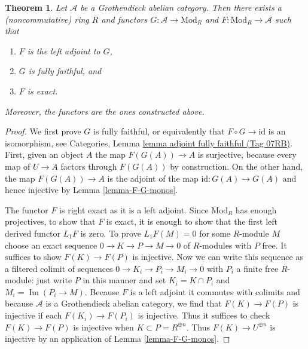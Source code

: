 \documentclass{amsart}
\theoremstyle{plain}
\newtheorem{theorem}[subsection]{Theorem}
\theoremstyle{definition}
\theoremstyle{remark}
\numberwithin{equation}{subsection}
\def\Im{\mathop{\mathrm{Im}}}
\begin{document}
\begin{theorem}
\label{theorem-gabriel-popescu}
Let $\mathcal{A}$ be a Grothendieck abelian category. Then there exists
a (noncommutative) ring $R$ and functors $G : \mathcal{A} \to \text{Mod}_R$
and $F : \text{Mod}_R \to \mathcal{A}$ such that
\begin{enumerate}
\item $F$ is the left adjoint to $G$,
\item $G$ is fully faithful, and
\item $F$ is exact.
\end{enumerate}
Moreover, the functors are the ones constructed above.
\end{theorem}

\begin{proof}
We first prove $G$ is fully faithful, or equivalently that
$F \circ G \to \text{id}$ is an isomorphism, see
Categories, Lemma \href{https://stacks.math.columbia.edu/tag/07RB}{lemma adjoint fully faithful (Tag 07RB)}.
First, given an object $A$ the map $F(G(A)) \to A$ is surjective,
because every map of $U \to A$ factors through $F(G(A))$ by construction.
On the other hand, the map $F(G(A)) \to A$ is the adjoint of the
map $\text{id} : G(A) \to G(A)$ and hence injective by
Lemma \ref{lemma-F-G-monos}.

\medskip\noindent
The functor $F$ is right exact as it is a left adjoint.
Since $\text{Mod}_R$ has enough projectives, to show that
$F$ is exact, it is enough to show that the first left derived
functor $L_1F$ is zero. To prove $L_1F(M) = 0$ for some $R$-module $M$
choose an exact sequence $0 \to K \to P \to M \to 0$
of $R$-modules with $P$ free. It suffices to show $F(K) \to F(P)$
is injective. Now we can write this sequence as a filtered
colimit of sequences $0 \to K_i \to P_i \to M_i \to 0$
with $P_i$ a finite free $R$-module: just write $P$ in this
manner and set $K_i = K \cap P_i$ and $M_i = \Im(P_i \to M)$.
Because $F$ is a left adjoint it commutes
with colimits and because $\mathcal{A}$ is a Grothendieck
abelian category, we find that $F(K) \to F(P)$
is injective if each $F(K_i) \to F(P_i)$ is injective.
Thus it suffices to check $F(K) \to F(P)$
is injective when $K \subset P = R^{\oplus n}$.
Thus $F(K) \to U^{\oplus n}$ is injective by an application
of Lemma \ref{lemma-F-G-monos}.
\end{proof}
\end{document}
